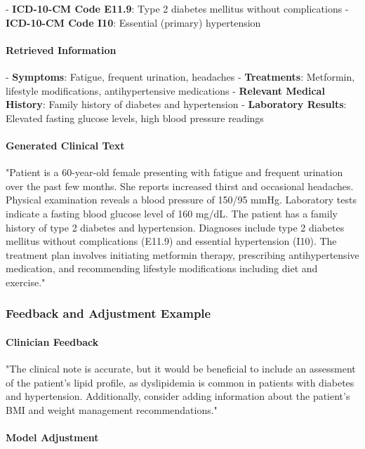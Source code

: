 \documentclass[12pt, a4paper]{article}
\begin{document}
- \textbf{ICD-10-CM Code E11.9}: Type 2 diabetes mellitus without complications
- \textbf{ICD-10-CM Code I10}: Essential (primary) hypertension

\paragraph{Retrieved Information}

- \textbf{Symptoms}: Fatigue, frequent urination, headaches
- \textbf{Treatments}: Metformin, lifestyle modifications, antihypertensive medications
- \textbf{Relevant Medical History}: Family history of diabetes and hypertension
- \textbf{Laboratory Results}: Elevated fasting glucose levels, high blood pressure readings

\paragraph{Generated Clinical Text}

"Patient is a 60-year-old female presenting with fatigue and frequent urination over the past few months. She reports increased thirst and occasional headaches. Physical examination reveals a blood pressure of 150/95 mmHg. Laboratory tests indicate a fasting blood glucose level of 160 mg/dL. The patient has a family history of type 2 diabetes and hypertension. Diagnoses include type 2 diabetes mellitus without complications (E11.9) and essential hypertension (I10). The treatment plan involves initiating metformin therapy, prescribing antihypertensive medication, and recommending lifestyle modifications including diet and exercise."

\subsubsection{Feedback and Adjustment Example}

\paragraph{Clinician Feedback}

"The clinical note is accurate, but it would be beneficial to include an assessment of the patient's lipid profile, as dyslipidemia is common in patients with diabetes and hypertension. Additionally, consider adding information about the patient's BMI and weight management recommendations."

\paragraph{Model Adjustment}
\end{document}
